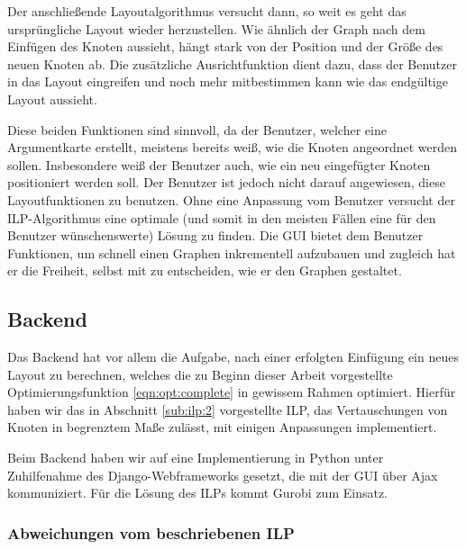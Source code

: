 Der anschließende Layoutalgorithmus versucht dann, so weit es geht das ursprüngliche
Layout wieder herzustellen. Wie ähnlich der Graph nach dem Einfügen des Knoten aussieht,
hängt stark von der Position und der Größe des neuen Knoten ab. Die zusätzliche
Ausrichtfunktion dient dazu, dass der Benutzer in das Layout eingreifen und noch mehr
mitbestimmen kann wie das endgültige Layout aussieht.

Diese beiden Funktionen sind sinnvoll, da der Benutzer, welcher eine Argumentkarte erstellt,
meistens bereits weiß, wie die Knoten angeordnet werden sollen. Insbesondere weiß der
Benutzer auch, wie ein neu eingefügter Knoten positioniert werden soll. Der Benutzer ist
jedoch nicht darauf angewiesen, diese Layoutfunktionen zu benutzen. Ohne eine Anpassung
vom Benutzer versucht der ILP-Algorithmus eine optimale (und somit in den meisten Fällen
eine für den Benutzer wünschenswerte) Lösung zu finden.
 Die GUI bietet dem Benutzer Funktionen, um schnell einen Graphen inkrementell aufzubauen
und zugleich hat er die Freiheit, selbst mit zu entscheiden, wie er den Graphen gestaltet.



\subsection{Backend}

Das Backend hat vor allem die Aufgabe, nach einer erfolgten Einfügung ein neues Layout zu berechnen, welches die zu Beginn dieser Arbeit vorgestellte Optimierungsfunktion \ref{eqn:opt:complete} in gewissem Rahmen optimiert. Hierfür haben wir das in Abschnitt \ref{sub:ilp:2} vorgestellte ILP, das Vertauschungen von Knoten in begrenztem Maße zulässt, mit einigen Anpassungen implementiert.

Beim Backend haben wir auf eine Implementierung in Python unter Zuhilfenahme des Django-Webframeworks\cite{django} gesetzt, die mit der GUI über Ajax kommuniziert. Für die Lösung des ILPs kommt Gurobi\cite{gurobi} zum Einsatz.

\subsubsection{Abweichungen vom beschriebenen ILP}
\label{sub:impl:opt}

